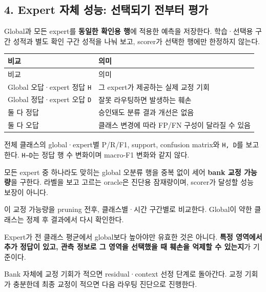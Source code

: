 \subsection{4. Expert 자체 성능: 선택되기 전부터 평가}
Global과 모든 expert를 \textbf{동일한 확인용 행}에 적용한 예측을 저장한다. 학습·선택용 구간 성적과 별도 확인 구간 성적을 나눠 보고, scorer가 선택한 행에만 한정하지 않는다.

\begingroup
\footnotesize
\begin{longtable}{>{\raggedright\arraybackslash}p{}>{\raggedright\arraybackslash}p{}}
\toprule
비교 & 의미 \\ \midrule
\endfirsthead
비교 & 의미 \\ \midrule
\endhead
{}Global 오답·expert 정답 \texttt{H} & 그 expert가 제공하는 실제 교정 기회 \\
{}Global 정답·expert 오답 \texttt{D} & 잘못 라우팅하면 발생하는 훼손 \\
{}둘 다 정답 & 승인돼도 분류 결과 개선은 없음 \\
{}둘 다 오답 & 클래스 변경에 따라 FP/\allowbreak{}FN 구성이 달라질 수 있음 \\
\bottomrule
\end{longtable}
\endgroup
\par\noindent \textbullet\enspace 전체 클래스의 global·expert별 P/\allowbreak{}R/\allowbreak{}F1, support, confusion matrix와 \texttt{H,\allowbreak{} D}를 보고한다. \texttt{H−D}는 정답 행 수 변화이며 macro-F1 변화와 같지 않다.


\par\noindent \textbullet\enspace 모든 expert 중 하나라도 맞히는 global 오분류 행을 중복 없이 세어 \textbf{bank 교정 가능량}을 구한다. 라벨을 보고 고르는 oracle은 진단용 잠재량이며, scorer가 달성할 성능 보장이 아니다.


\par\noindent \textbullet\enspace 이 교정 가능량을 pruning 전후, 클래스별·시간 구간별로 비교한다. Global이 약한 클래스는 정제 후 결과에서 다시 확인한다.


\par\noindent \textbullet\enspace Expert가 전 클래스 평균에서 global보다 높아야만 유효한 것은 아니다. \textbf{특정 영역에서 추가 정답이 있고, 관측 정보로 그 영역을 선택했을 때 훼손을 억제할 수 있는지}가 기준이다.


Bank 자체에 교정 기회가 적으면 residual·context 선정 단계로 돌아간다. 교정 기회가 충분한데 최종 교정이 적으면 다음 라우팅 진단으로 진행한다.

